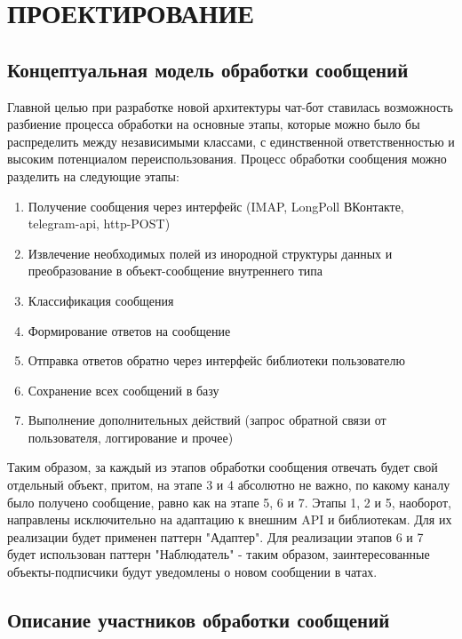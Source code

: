 \section{ПРОЕКТИРОВАНИЕ}
    \subsection{Концептуальная модель обработки сообщений}
    Главной целью при разработке новой архитектуры чат-бот ставилась возможность
    разбиение процесса обработки на основные этапы, которые можно было бы
    распределить между независимыми классами, с единственной ответственностью и
    высоким потенциалом переиспользования.
    Процесс обработки сообщения можно разделить на следующие этапы:
    \begin{enumerate}
        \item Получение сообщения через интерфейс (IMAP, LongPoll ВКонтакте, 
        telegram-api, http-POST)
        \item Извлечение необходимых полей из инородной структуры данных и 
        преобразование в объект-сообщение внутреннего типа
        \item Классификация сообщения
        \item Формирование ответов на сообщение
        \item Отправка ответов обратно через интерфейс библиотеки пользователю
        \item Сохранение всех сообщений в базу
        \item Выполнение дополнительных действий (запрос обратной связи от
        пользователя, логгирование и прочее)
    \end{enumerate}

    Таким образом, за каждый из этапов обработки сообщения отвечать будет свой 
    отдельный объект, притом, на этапе 3 и 4 абсолютно не важно, по какому 
    каналу было получено сообщение, равно как на этапе 5, 6 и 7. Этапы 1, 2 и 5, 
    наоборот, направлены исключительно на адаптацию к внешним API и библиотекам.
    Для их реализации будет применен паттерн "Адаптер". Для реализации этапов
    6 и 7 будет использован паттерн "Наблюдатель" - таким образом,
    заинтересованные объекты-подписчики будут уведомлены о новом сообщении в чатах.
    \cite{design.patterns}
    
    \subsection{Описание участников обработки сообщений}
